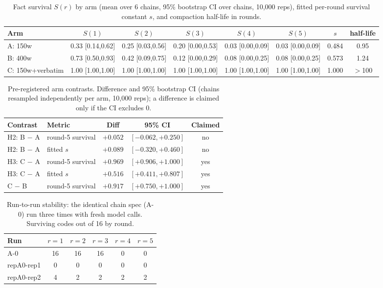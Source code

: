 \begin{table}[t]\centering\footnotesize
\setlength{\tabcolsep}{2pt}
\caption{Fact survival $S(r)$ by arm (mean over 6 chains, 95\% bootstrap CI over chains, 10{,}000 reps), fitted per-round survival constant $s$, and compaction half-life in rounds.}
\label{tab:survival}
\begin{tabular}{lccccccc}
\toprule
Arm & $S(1)$ & $S(2)$ & $S(3)$ & $S(4)$ & $S(5)$ & $s$ & half-life \\
\midrule
A: 150w & 0.33 [0.14,0.62] & 0.25 [0.03,0.56] & 0.20 [0.00,0.53] & 0.03 [0.00,0.09] & 0.03 [0.00,0.09] & 0.484 & 0.95 \\
B: 400w & 0.73 [0.50,0.93] & 0.42 [0.09,0.75] & 0.12 [0.00,0.29] & 0.08 [0.00,0.25] & 0.08 [0.00,0.25] & 0.573 & 1.24 \\
C: 150w+verbatim & 1.00 [1.00,1.00] & 1.00 [1.00,1.00] & 1.00 [1.00,1.00] & 1.00 [1.00,1.00] & 1.00 [1.00,1.00] & 1.000 & $>$100 \\
\bottomrule
\end{tabular}
\end{table}

\begin{table}[t]\centering\small
\caption{Pre-registered arm contrasts. Difference and 95\% bootstrap CI (chains resampled independently per arm, 10{,}000 reps); a difference is claimed only if the CI excludes 0.}
\label{tab:contrasts}
\begin{tabular}{llccc}
\toprule
Contrast & Metric & Diff & 95\% CI & Claimed \\
\midrule
H2: B $-$ A & round-5 survival & $+0.052$ & $[-0.062,+0.250]$ & no \\
H2: B $-$ A & fitted $s$ & $+0.089$ & $[-0.320,+0.460]$ & no \\
H3: C $-$ A & round-5 survival & $+0.969$ & $[+0.906,+1.000]$ & yes \\
H3: C $-$ A & fitted $s$ & $+0.516$ & $[+0.411,+0.807]$ & yes \\
C $-$ B & round-5 survival & $+0.917$ & $[+0.750,+1.000]$ & yes \\
\bottomrule
\end{tabular}
\end{table}

\begin{table}[t]\centering\small
\caption{Run-to-run stability: the identical chain spec (A-0) run three times with fresh model calls. Surviving codes out of 16 by round.}
\label{tab:spotrepeat}
\begin{tabular}{lccccc}
\toprule
Run & $r{=}1$ & $r{=}2$ & $r{=}3$ & $r{=}4$ & $r{=}5$ \\
\midrule
A-0 & 16 & 16 & 16 & 0 & 0 \\
repA0-rep1 & 0 & 0 & 0 & 0 & 0 \\
repA0-rep2 & 4 & 2 & 2 & 2 & 2 \\
\bottomrule
\end{tabular}
\end{table}
